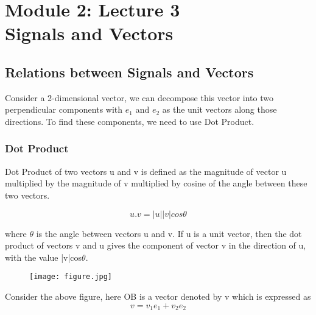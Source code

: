 \section{Module 2: Lecture 3\\Signals and Vectors}


\subsection{Relations between Signals and Vectors}
Consider a 2-dimensional vector, we can decompose this vector into two perpendicular components with $e_1$ and $e_2$ as the unit vectors along those directions. To find these components, we need to use Dot Product.
\subsubsection{Dot Product}
	Dot Product of two vectors u and v is defined as the magnitude of vector u multiplied by the magnitude of v multiplied by cosine of the angle between these two vectors.
    
	    					\begin{equation*}u.v = |u||v|cos\theta\end{equation*}
                            
where $\theta$ is the angle between vectors u and v. If u is a unit vector, then the dot product of vectors v and u gives the component of vector v in the direction of u, with the value |v|cos$\theta$.
	\begin{figure}[ht]
\centering
\texttt{[image: figure.jpg]}
\end{figure}
    
    
    Consider the above figure, here OB is a vector denoted by v which is expressed as
    \begin{equation*}v = v_1e_1 + v_2e_2\end{equation*}
    
